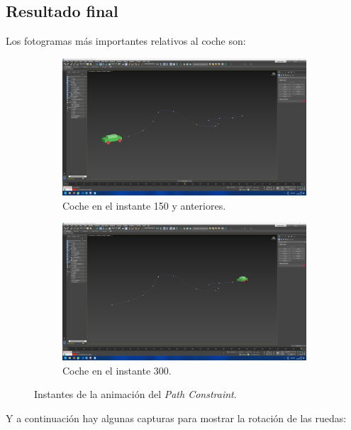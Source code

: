 \subsection{Resultado final}

Los fotogramas más importantes relativos al coche son:

\begin{figure}[H]
    \centering
    \begin{subfigure}[t]{0.48\textwidth}
        \centering
        \includegraphics[width=\textwidth]{imagenes/coche/keyframes/150.png}
        \caption{Coche en el instante 150 y anteriores.}
    \end{subfigure}
    \hfill
    \begin{subfigure}[t]{0.48\textwidth}
        \centering
        \includegraphics[width=\textwidth]{imagenes/coche/keyframes/300.png}
        \caption{Coche en el instante 300.}
    \end{subfigure}
    \caption{Instantes de la animación del \textit{Path Constraint}.}
\end{figure}

Y a continuación hay algunas capturas para mostrar la rotación de las ruedas:

